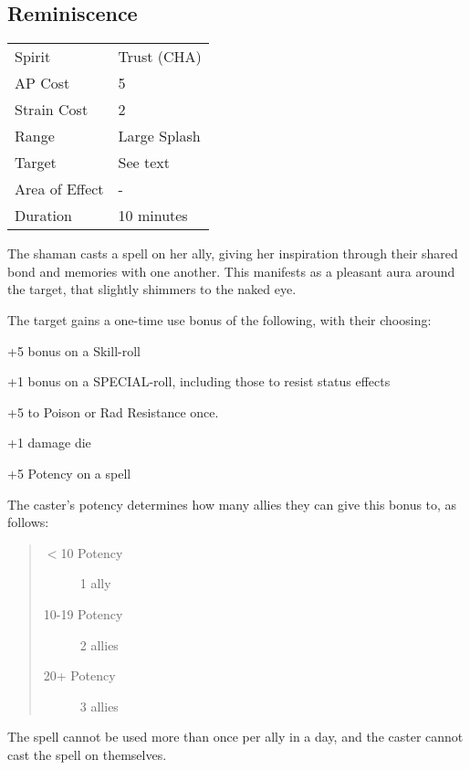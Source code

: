\documentclass[11pt,a4paper,twocolumn]{book}
\begin{document}
\subsection*{Reminiscence}
{
	\begin{tabu} to 70mm{| X[l,4] | X[l,7] |}
		\hline
		Spirit         & Trust (CHA)  \\
		AP Cost        & 5            \\
		Strain Cost    & 2            \\
		Range          & Large Splash \\
		Target         & See text     \\
		Area of Effect & -            \\
		Duration       & 10 minutes   \\ \hline
	\end{tabu}
	
}
\medskip

The shaman casts a spell on her ally, giving her inspiration through their shared bond and memories with one another. This manifests as a pleasant aura around the target, that slightly shimmers to the naked eye. 

The target gains a one-time use bonus of the following, with their choosing:
\begin{compactitem}
	\item +5 bonus on a Skill-roll
	\item +1 bonus on a SPECIAL-roll, including those to resist status effects
	\item +5 to Poison or Rad Resistance once.
	\item +1 damage die
	\item +5 Potency on a spell
\end{compactitem}

The caster's potency determines how many allies they can give this bonus to, as follows:
\begin{quote}
	\begin{description}
		\item[$<$10 Potency] 	1 ally
		\item[10-19 Potency] 	2 allies
		\item[20+ Potency] 		3 allies
	\end{description}	
\end{quote}

The spell cannot be used more than once per ally in a day, and the caster cannot cast the spell on themselves.
\end{document}
